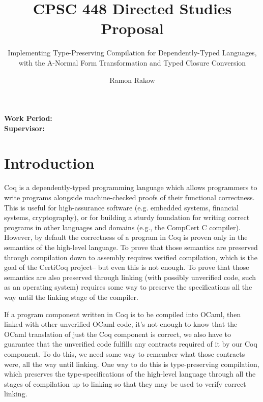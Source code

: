 \documentclass[manuscript]{acmart}
\begin{document}
\title{CPSC 448 Directed Studies Proposal}
\subtitle{Implementing Type-Preserving Compilation for Dependently-Typed Languages, with the A-Normal Form Transformation and Typed Closure Conversion}
\author{Ramon Rakow}
\maketitle

\textbf{Work Period:}
\\
\textbf{Supervisor:}

\section{Introduction}

Coq is a dependently-typed programming language which allows programmers to write programs alongside machine-checked proofs of their functional correctness. This is useful for high-assurance software (e.g. embedded systems, financial systems, cryptography), or for building a sturdy foundation for writing correct programs in other languages and domains (e.g., the CompCert C compiler). However, by default the correctness of a program in Coq is proven only in the semantics of the high-level language. To prove that those semantics are preserved through compilation down to assembly requires verified compilation, which is the goal of the CertiCoq project-- but even this is not enough. To prove that those semantics are also preserved through linking (with possibly unverified code, such as an operating system) requires some way to preserve the specifications all the way until the linking stage of the compiler. 

If a program component written in Coq is to be compiled into OCaml, then linked with other unverified OCaml code, it's not enough to know that the OCaml translation of just the Coq component is correct, we also have to guarantee that the unverified code fulfills any contracts required of it by our Coq component. To do this, we need some way to remember what those contracts were, all the way until linking. One way to do this is type-preserving compilation, which preserves the type-specifications of the high-level language through all the stages of compilation up to linking so that they may be used to verify correct linking.
\end{document}
